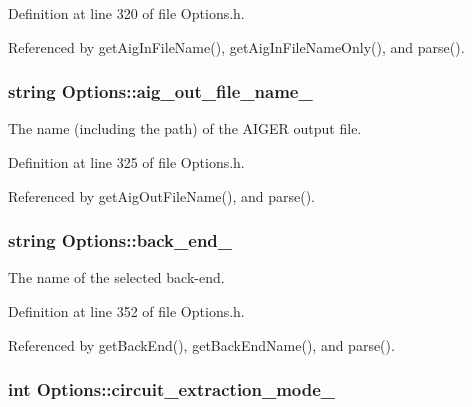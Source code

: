 Definition at line 320 of file Options.\-h.



Referenced by get\-Aig\-In\-File\-Name(), get\-Aig\-In\-File\-Name\-Only(), and parse().

\hypertarget{classOptions_a35b7f590e9d752f297d3a99f855da970}{
\subsubsection[{aig\-\_\-out\-\_\-file\-\_\-name\-\_\-}]{\setlength{\rightskip}{0pt plus 5cm}string Options\-::aig\-\_\-out\-\_\-file\-\_\-name\-\_\-\hspace{0.3cm}{\ttfamily [protected]}}}\label{classOptions_a35b7f590e9d752f297d3a99f855da970}


The name (including the path) of the A\-I\-G\-E\-R output file. 



Definition at line 325 of file Options.\-h.



Referenced by get\-Aig\-Out\-File\-Name(), and parse().

\hypertarget{classOptions_ab049675ae9fd3fc7693dfa53266da8c8}{
\subsubsection[{back\-\_\-end\-\_\-}]{\setlength{\rightskip}{0pt plus 5cm}string Options\-::back\-\_\-end\-\_\-\hspace{0.3cm}{\ttfamily [protected]}}}\label{classOptions_ab049675ae9fd3fc7693dfa53266da8c8}


The name of the selected back-\/end. 



Definition at line 352 of file Options.\-h.



Referenced by get\-Back\-End(), get\-Back\-End\-Name(), and parse().

\hypertarget{classOptions_a8fc8a1d275e31a687c692ebdcfcef92f}{
\subsubsection[{circuit\-\_\-extraction\-\_\-mode\-\_\-}]{\setlength{\rightskip}{0pt plus 5cm}int Options\-::circuit\-\_\-extraction\-\_\-mode\-\_\-\hspace{0.3cm}{\ttfamily [protected]}}}\label{classOptions_a8fc8a1d275e31a687c692ebdcfcef92f}


